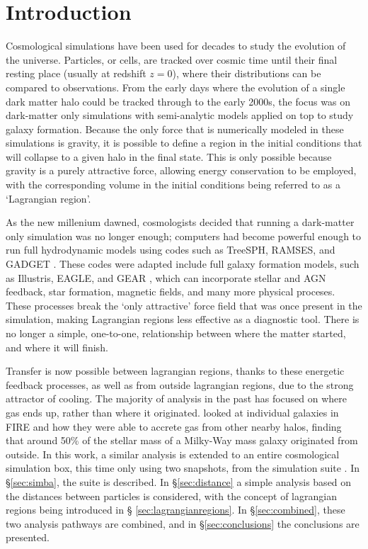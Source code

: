 \section{Introduction}

Cosmological simulations have been used for decades to study the evolution of
the universe. Particles, or cells, are tracked over cosmic time until their
final resting place (usually at redshift $z=0$), where their distributions can
be compared to observations. From the early days where the evolution of a
single dark matter halo could be tracked through to the early 2000s, the focus
was on dark-matter only simulations with semi-analytic models applied on top to
study galaxy formation. Because the only force that is numerically modeled in
these simulations is gravity, it is possible to define a region in the initial
conditions that will collapse to a given halo in the final state. This is only
possible because gravity is a purely attractive force, allowing energy
conservation to be employed, with the corresponding volume in the initial
conditions being referred to as a `Lagrangian region'.

As the new millenium dawned, cosmologists decided that running a dark-matter
only simulation was no longer enough; computers had become powerful enough to
run full hydrodynamic models using codes such as TreeSPH, RAMSES, and GADGET 
\citep{}. These codes were adapted include full galaxy formation models, such as
Illustris, EAGLE, and GEAR \citep{}, which can incorporate stellar and AGN
feedback, star formation, magnetic fields, and many more physical proceses.
These processes break the `only attractive' force field that was once present
in the simulation, making Lagrangian regions less effective as a diagnostic
tool. There is no longer a simple, one-to-one, relationship between where
the matter started, and where it will finish.

Transfer is now possible between lagrangian regions, thanks to these energetic
feedback processes, as well as from outside lagrangian regions, due to the
strong attractor of cooling. The majority of analysis in the past has focused
on where gas ends up, rather than where it originated.
\citet{anglesalcazar2017} looked at individual galaxies in FIRE \citep{fire}
and how they were able to accrete gas from other nearby halos, finding that
around 50\% of the stellar mass of a Milky-Way mass galaxy originated from
outside. In this work, a similar analysis is extended to an entire cosmological
simulation box, this time only using two snapshots, from the \simba simulation
suite \citep{dave2018}. In \S \ref{sec:simba}, the \simba suite is described.
In \S \ref{sec:distance} a simple analysis based on the distances between particles
is considered, with the concept of lagrangian regions being introduced in \S
\ref{sec:lagrangianregions}. In \S \ref{sec:combined}, these two analysis pathways
are combined, and in \S \ref{sec:conclusions} the conclusions are presented.
